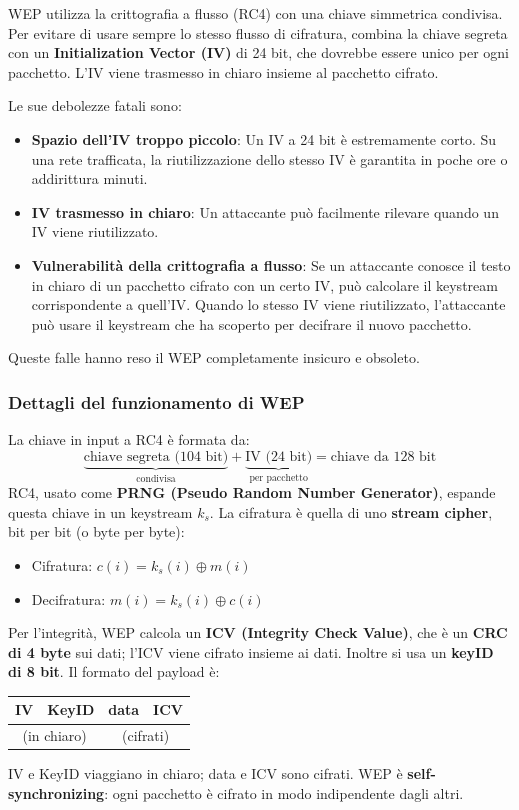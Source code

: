 WEP utilizza la crittografia a flusso (RC4) con una chiave simmetrica condivisa. Per evitare di usare sempre lo stesso flusso di cifratura, combina la chiave segreta con un \textbf{Initialization Vector (IV)} di 24 bit, che dovrebbe essere unico per ogni pacchetto. L'IV viene trasmesso in chiaro insieme al pacchetto cifrato.

Le sue debolezze fatali sono:
\begin{itemize}
    \item \textbf{Spazio dell'IV troppo piccolo}: Un IV a 24 bit è estremamente corto. Su una rete trafficata, la riutilizzazione dello stesso IV è garantita in poche ore o addirittura minuti.
    \item \textbf{IV trasmesso in chiaro}: Un attaccante può facilmente rilevare quando un IV viene riutilizzato.
    \item \textbf{Vulnerabilità della crittografia a flusso}: Se un attaccante conosce il testo in chiaro di un pacchetto cifrato con un certo IV, può calcolare il keystream corrispondente a quell'IV. Quando lo stesso IV viene riutilizzato, l'attaccante può usare il keystream che ha scoperto per decifrare il nuovo pacchetto.
\end{itemize}

Queste falle hanno reso il WEP completamente insicuro e obsoleto.

\subsubsection{Dettagli del funzionamento di WEP}
La chiave in input a RC4 è formata da:
$$\underbrace{\text{chiave segreta (104 bit)}}_{\text{condivisa}} + \underbrace{\text{IV (24 bit)}}_{\text{per pacchetto}} = \text{chiave da 128 bit}$$
RC4, usato come \textbf{PRNG (Pseudo Random Number Generator)}, espande questa chiave in un keystream $k_s$. La cifratura è quella di uno \textbf{stream cipher}, bit per bit (o byte per byte):
\begin{itemize}
    \item Cifratura: $c(i) = k_s(i) \oplus m(i)$
    \item Decifratura: $m(i) = k_s(i) \oplus c(i)$
\end{itemize}
Per l'integrità, WEP calcola un \textbf{ICV (Integrity Check Value)}, che è un \textbf{CRC di 4 byte} sui dati; l'ICV viene cifrato insieme ai dati. Inoltre si usa un \textbf{keyID di 8 bit}. Il formato del payload è:
\begin{center}
    \begin{tabular}{|c|c|c|c|}
        \hline
        \textbf{IV} & \textbf{KeyID} & \textbf{data} & \textbf{ICV} \\
        \hline
        \multicolumn{2}{|c|}{(in chiaro)} & \multicolumn{2}{c|}{(cifrati)} \\
        \hline
    \end{tabular}
\end{center}
IV e KeyID viaggiano in chiaro; data e ICV sono cifrati. WEP è \textbf{self-synchronizing}: ogni pacchetto è cifrato in modo indipendente dagli altri.

